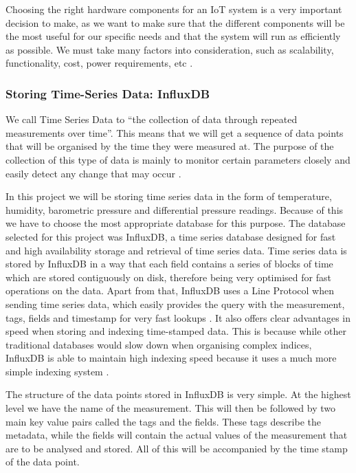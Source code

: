 \documentclass[12pt]{article}
\begin{document}
Choosing the right hardware components for an IoT system is a very important decision to make, as we want to make sure that the different components will be the most useful for our specific needs and that the system will run as efficiently as possible. We must take many factors into consideration, such as scalability, functionality, cost, power requirements, etc \cite{digiteum}.

\subsubsection{Storing Time-Series Data: InfluxDB}

We call Time Series Data to ``the collection of data through repeated measurements over time''. This means that we will get a sequence of data points that will be organised by the time they were measured at. The purpose of the collection of this type of data is mainly to monitor certain parameters closely and easily detect any change that may occur \cite{influx:time-series}.\par

In this project we will be storing time series data in the form of temperature, humidity, barometric pressure and differential pressure readings. Because of this we have to choose the most appropriate database for this purpose. The database selected for this project was InfluxDB, a time series database designed for fast and high availability storage and retrieval of time series data. Time series data is stored by InfluxDB in a way that each field contains a series of blocks of time which are stored contiguously on disk, therefore being very optimised for fast operations on the data. Apart from that, InfluxDB uses a Line Protocol when sending time series data, which easily provides the query with the measurement, tags, fields and timestamp for very fast lookups \cite{influx:time-series}. It also offers clear advantages in speed when storing and indexing time-stamped data. This is because while other traditional databases would slow down when organising complex indices, InfluxDB is able to maintain high indexing speed because it uses a much more simple indexing system \cite{ionos}. \par

The structure of the data points stored in InfluxDB is very simple. At the highest level we have the name of the measurement. This will then be followed by two main key value pairs called the tags and the fields. These tags describe the metadata, while the fields will contain the actual values of the measurement that are to be analysed and stored. All of this will be accompanied by the time stamp of the data point. \par
\end{document}
